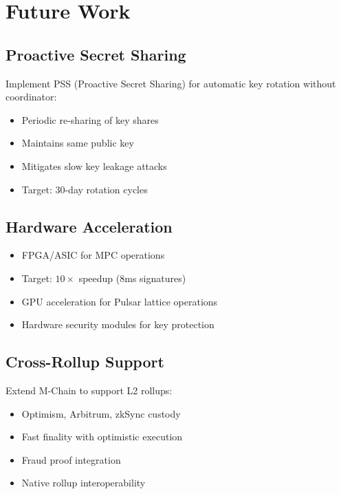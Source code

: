 \section{Future Work}


\subsection{Proactive Secret Sharing}

Implement PSS (Proactive Secret Sharing) for automatic key rotation without coordinator:
\begin{itemize}
\item Periodic re-sharing of key shares
\item Maintains same public key
\item Mitigates slow key leakage attacks
\item Target: 30-day rotation cycles
\end{itemize}

\subsection{Hardware Acceleration}

\begin{itemize}
\item FPGA/ASIC for MPC operations
\item Target: $10\times$ speedup (8ms signatures)
\item GPU acceleration for Pulsar lattice operations
\item Hardware security modules for key protection
\end{itemize}

\subsection{Cross-Rollup Support}

Extend M-Chain to support L2 rollups:
\begin{itemize}
\item Optimism, Arbitrum, zkSync custody
\item Fast finality with optimistic execution
\item Fraud proof integration
\item Native rollup interoperability
\end{itemize}

